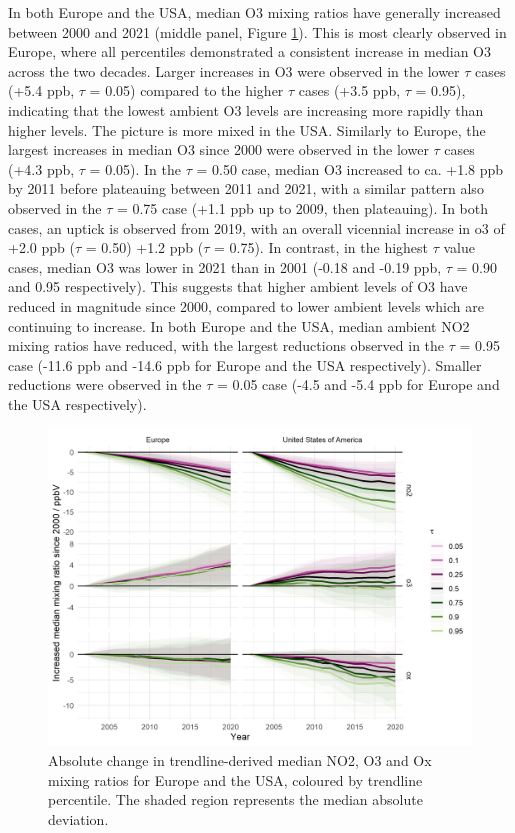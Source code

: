 \documentclass[journal abbreviation, manuscript]{copernicus}
\begin{document}
In both Europe and the USA, median O3 mixing ratios have generally increased between 2000 and 2021 (middle panel, Figure \ref{median_slopes_per_tau_cont_name_absolute}). This is most clearly observed in Europe, where all percentiles demonstrated a consistent increase in median O3 across the two decades. Larger increases in O3 were observed in the lower $\tau$ cases (+5.4 ppb, $\tau$ = 0.05) compared to the higher $\tau$ cases (+3.5 ppb, $\tau$ = 0.95), indicating that the lowest ambient O3 levels are increasing more rapidly than higher levels.  The picture is more mixed in the USA. Similarly to Europe, the largest increases in median O3 since 2000 were observed in the lower $\tau$ cases (+4.3 ppb, $\tau$ = 0.05). In the $\tau$ = 0.50 case, median O3 increased to ca. +1.8 ppb by 2011 before plateauing between 2011 and 2021, with a similar pattern also observed in the $\tau$ = 0.75 case (+1.1 ppb up to 2009, then plateauing). In both cases, an uptick is observed from 2019, with an overall vicennial increase in o3 of +2.0 ppb ($\tau$ = 0.50) +1.2 ppb ($\tau$ = 0.75). In contrast, in the highest $\tau$ value cases, median O3 was lower in 2021 than in 2001 (-0.18 and -0.19 ppb, $\tau$ = 0.90 and 0.95 respectively). This suggests that higher ambient levels of O3 have reduced in magnitude since 2000, compared to lower ambient levels which are continuing to increase. In both Europe and the USA, median ambient NO2 mixing ratios have reduced, with the largest reductions observed in the $\tau$ = 0.95 case (-11.6 ppb and -14.6 ppb for Europe and the USA respectively). Smaller reductions were observed in the $\tau$ = 0.05 case (-4.5 and -5.4 ppb for Europe and the USA respectively).

\begin{figure}[h!]
\includegraphics[width=12cm]{plots/fixed_median_slopes_per_tau_continent_name_absolute_change_with_mad_ribbon.png}
\caption{Absolute change in trendline-derived median NO2, O3 and Ox mixing ratios for Europe and the USA, coloured by trendline percentile. The shaded region represents the median absolute deviation.}
\label{median_slopes_per_tau_cont_name_absolute}
\end{figure}
\end{document}
